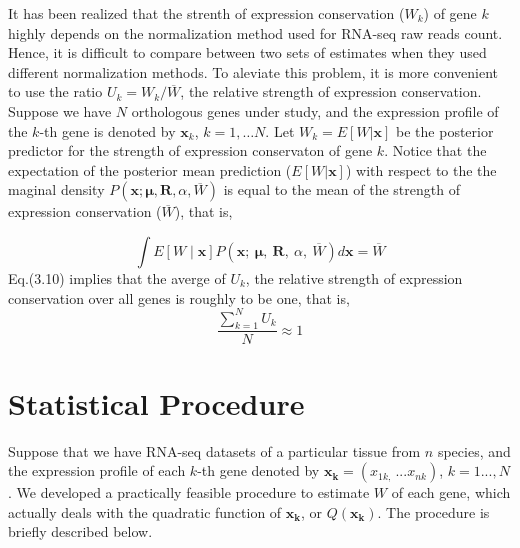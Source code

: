 \documentclass[]{book}
\begin{document}
It has been realized that the strenth of expression conservation (\(W_k\)) of gene \(k\) highly depends on the normalization method used for RNA-seq raw reads count. Hence, it is difficult to compare between two sets of estimates when they used different normalization methods. To aleviate this problem, it is more convenient to use the ratio \(U_k=W_k/\overline{W}\), the relative strength of expression conservation. Suppose we have \(N\) orthologous genes under study, and the expression profile of the \(k\)-th gene is denoted by \(\boldsymbol{x}_k\), \(k=1,…N\). Let \(W_{k}=E\left[W|\boldsymbol{x}\right]\) be the posterior predictor for the strength of expression conservaton of gene \(k\). Notice that the expectation of the posterior mean prediction (\(E\left[W|\boldsymbol{x}\right]\)) with respect to the the maginal density \(P\left(\boldsymbol{x};\boldsymbol{\mu},\boldsymbol{R},\alpha,\overline{W}\right)\) is equal to the mean of the strength of expression conservation (\(\overline{W}\)), that is,

\[\int E\left[W\mid \boldsymbol{x}\right]P\left(\boldsymbol{x};\  \boldsymbol{\mu},\  \boldsymbol{R},\  \alpha,\  \overline{W}\right)d\boldsymbol{x}=\overline{W}\tag{3.10}\]
Eq.(3.10) implies that the averge of \(U_k\), the relative strength of expression conservation over all genes is roughly to be one, that is,\\
\[\frac{\sum_{k=1}^NU_k}{N}\approx1\tag{3.11}\]
\newpage

\hypertarget{statistical-procedure}{%
\section{Statistical Procedure}\label{statistical-procedure}}

Suppose that we have RNA-seq datasets of a particular tissue from \(n\) species, and the expression profile of each \(k\)-th gene denoted by \(\boldsymbol{x_k}=\left(x_{1k,\  }...x_{nk}\right)\), \(k=1...,N\). We developed a practically feasible procedure to estimate \(W\) of each gene, which actually deals with the quadratic function of \(\boldsymbol{x_{k}}\), or \(Q\left(\boldsymbol{x_k}\right)\). The procedure is briefly described below.
\end{document}
